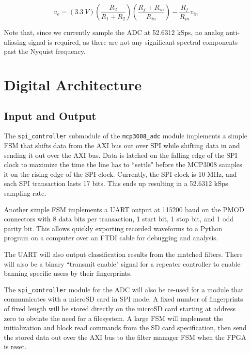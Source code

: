 \documentclass[conference]{IEEEtran}
\begin{document}
\begin{equation*}
    v_o = (\SI{3.3}{V}) \left( \frac{R_2}{R_1 + R_2} \right) \left( \frac{R_f + R_{in}}{R_{in}} \right) - \frac{R_f}{R_{in}} v_{in}
\end{equation*}

Note that, since we currently sample the ADC at 52.6312 kSps, no analog anti-aliasing signal is required, as there are not any significant spectral components past the Nyquist frequency.

\section{Digital Architecture}

\subsection{Input and Output}

The \lstinline{spi_controller} submodule of the \lstinline{mcp3008_adc} module implements a simple FSM that shifts data from the AXI bus out over SPI while shifting data in and sending it out over the AXI bus. Data is latched on the falling edge of the SPI clock to maximize the time the line has to ``settle" before the MCP3008 samples it on the rising edge of the SPI clock. Currently, the SPI clock is 10 MHz, and each SPI transaction lasts 17 bits. This ends up resulting in a 52.6312 kSps sampling rate.

Another simple FSM implements a UART output at 115200 baud on the PMOD connectors with 8 data bits per transaction, 1 start bit, 1 stop bit, and 1 odd parity bit. This allows quickly exporting recorded waveforms to a Python program on a computer over an FTDI cable for debugging and analysis.

The UART will also output classification results from the matched filters. There will also be a binary ``transmit enable" signal for a repeater controller to enable banning specific users by their fingerprints.

The \lstinline{spi_controller} module for the ADC will also be re-used for a module that communicates with a microSD card in SPI mode. A fixed number of fingerprints of fixed length will be stored directly on the microSD card starting at address zero to obviate the need for a filesystem. A large FSM will implement the initialization and block read commands from the SD card specification, then send the stored data out over the AXI bus to the filter manager FSM when the FPGA is reset.
\end{document}

